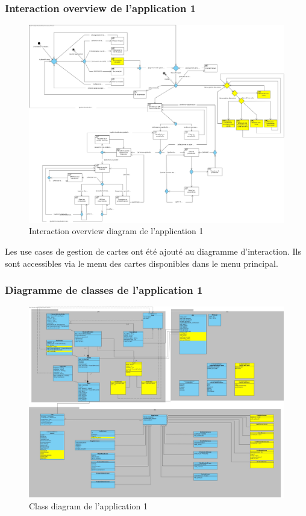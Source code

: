 \documentclass[../rapport.tex]{subfiles}
\begin{document}
\subsubsection{Interaction overview de l'application 1}
	\begin{figure}[h!]
		\centering\includegraphics[scale=0.15]{ressources/photos_diagrammes/extensionTheo/diagrams1/InteractionOverviewDiagram1.jpg}
		\caption{Interaction overview diagram de l'application 1}
	\end{figure}

Les use cases de gestion de cartes ont été ajouté au diagramme d'interaction.
Ils sont accessibles via le menu des cartes disponibles dans le menu principal.\\

\subsubsection{Diagramme de classes de l'application 1}
	\begin{figure}[h!]
		\centering\includegraphics[scale=0.15]{ressources/photos_diagrammes/extensionTheo/diagrams1/classDiagram1.jpg}
		\caption{Class diagram de l'application 1}
	\end{figure}
\end{document}
